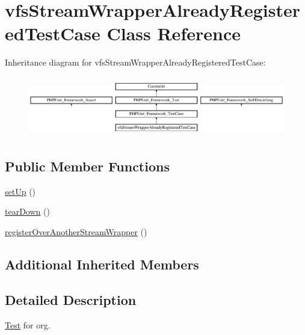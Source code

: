 \hypertarget{classorg_1_1bovigo_1_1vfs_1_1vfs_stream_wrapper_already_registered_test_case}{}\section{vfs\+Stream\+Wrapper\+Already\+Registered\+Test\+Case Class Reference}
\label{classorg_1_1bovigo_1_1vfs_1_1vfs_stream_wrapper_already_registered_test_case}
Inheritance diagram for vfs\+Stream\+Wrapper\+Already\+Registered\+Test\+Case\+:\begin{figure}[H]
\begin{center}
\leavevmode
\includegraphics[height=2.647754cm]{classorg_1_1bovigo_1_1vfs_1_1vfs_stream_wrapper_already_registered_test_case}
\end{center}
\end{figure}
\subsection*{Public Member Functions}
\begin{DoxyCompactItemize}
\item 
\mbox{\hyperlink{classorg_1_1bovigo_1_1vfs_1_1vfs_stream_wrapper_already_registered_test_case_a0bc688732d2b3b162ffebaf7812e78da}{set\+Up}} ()
\item 
\mbox{\hyperlink{classorg_1_1bovigo_1_1vfs_1_1vfs_stream_wrapper_already_registered_test_case_a80fe3d17e658907fc75346a0ec9d6fc7}{tear\+Down}} ()
\item 
\mbox{\hyperlink{classorg_1_1bovigo_1_1vfs_1_1vfs_stream_wrapper_already_registered_test_case_ae5105c02600f048240faf8ebfc6aa129}{register\+Over\+Another\+Stream\+Wrapper}} ()
\end{DoxyCompactItemize}
\subsection*{Additional Inherited Members}


\subsection{Detailed Description}
\mbox{\hyperlink{class_test}{Test}} for org. 

